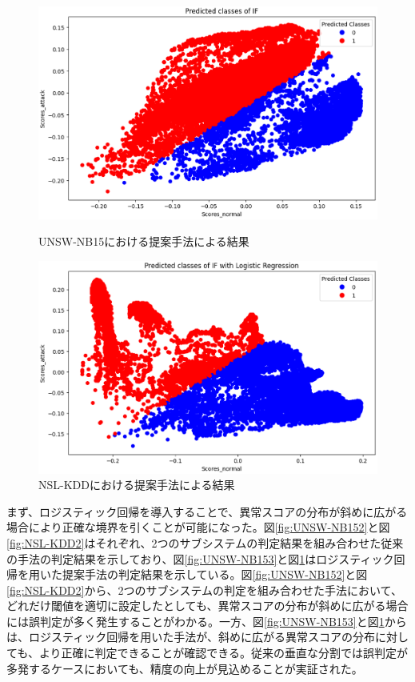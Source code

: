 \documentclass{css}
\begin{document}
\begin{figure}[ht]
    \centering
    \begin{minipage}{0.9\linewidth}
        \centering
        \includegraphics[width=\linewidth]{pictures/eps/UNSW-NB153.eps}
        \caption{UNSW-NB15における提案手法による結果}
        \label{fig:UNSW-NB153}
    \end{minipage}
    \vfill{} 
    \begin{minipage}{0.9\linewidth}
        \centering
        \includegraphics[width=\linewidth]{pictures/eps/NSL-KDD3.eps}
        \caption{NSL-KDDにおける提案手法による結果}
        \label{fig:NSL-KDD3}
    \end{minipage}
\end{figure}

まず、ロジスティック回帰を導入することで、異常スコアの分布が斜めに広がる場合により正確な境界を引くことが可能になった。図\ref{fig:UNSW-NB152}と図\ref{fig:NSL-KDD2}はそれぞれ、2つのサブシステムの判定結果を組み合わせた従来の手法の判定結果を示しており、図\ref{fig:UNSW-NB153}と図\ref{fig:NSL-KDD3}はロジスティック回帰を用いた提案手法の判定結果を示している。図\ref{fig:UNSW-NB152}と図\ref{fig:NSL-KDD2}から、2つのサブシステムの判定を組み合わせた手法において、どれだけ閾値を適切に設定したとしても、異常スコアの分布が斜めに広がる場合には誤判定が多く発生することがわかる。一方、図\ref{fig:UNSW-NB153}と図\ref{fig:NSL-KDD3}からは、ロジスティック回帰を用いた手法が、斜めに広がる異常スコアの分布に対しても、より正確に判定できることが確認できる。従来の垂直な分割では誤判定が多発するケースにおいても、精度の向上が見込めることが実証された。
\end{document}
